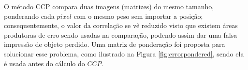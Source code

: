 O método CCP compara duas imagens (matrizes) do mesmo tamanho, 
ponderando cada $pixel$ com o mesmo peso sem importar a posição; 
consequentemente, o valor da correlação se vê reduzido visto que existem áreas produtoras 
de erro sendo usadas na comparação,
podendo assim dar uma falsa impressão de objeto perdido. 
Uma matriz de ponderação foi proposta para solucionar esse problema, como ilustrado na 
Figura \ref{fig:errorpondered}, sendo
ela é usada antes do cálculo do $CCP$.

